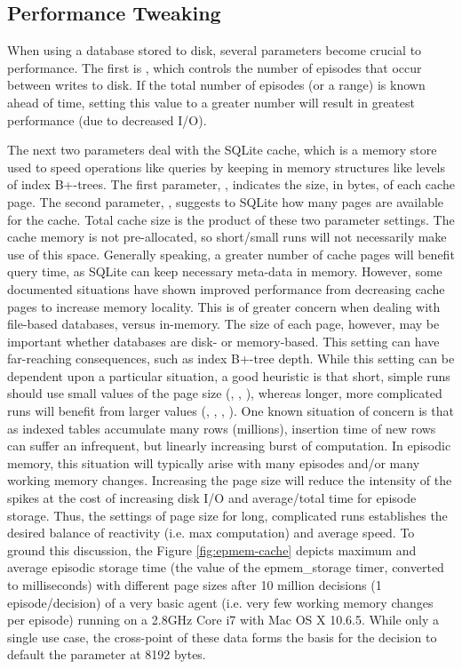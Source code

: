 \subsection{Performance Tweaking}
When using a database stored to disk, several parameters become crucial to performance.
The first is , which controls the number of episodes that occur between writes to disk.
If the total number of episodes (or a range) is known ahead of time, setting this value to a greater number will result in greatest performance (due to decreased I/O).

The next two parameters deal with the SQLite cache, which is a memory store used to speed operations like queries by keeping in memory structures like levels of index B+-trees.
The first parameter, , indicates the size, in bytes, of each cache page.
The second parameter, , suggests to SQLite how many pages are available for the cache.
Total cache size is the product of these two parameter settings.
The cache memory is not pre-allocated, so short/small runs will not necessarily make use of this space.
Generally speaking, a greater number of cache pages will benefit query time, as SQLite can keep necessary meta-data in memory.
However, some documented situations have shown improved performance from decreasing cache pages to increase memory locality.
This is of greater concern when dealing with file-based databases, versus in-memory.
The size of each page, however, may be important whether databases are disk- or memory-based.
This setting can have far-reaching consequences, such as index B+-tree depth.
While this setting can be dependent upon a particular situation, a good heuristic is that short, simple runs should use small values of the page size (, , ), whereas longer, more complicated runs will benefit from larger values (, , , ).
One known situation of concern is that as indexed tables accumulate many rows (\tild millions), insertion time of new rows can suffer an infrequent, but linearly increasing burst of computation.
In episodic memory, this situation will typically arise with many episodes and/or many working memory changes.
Increasing the page size will reduce the intensity of the spikes at the cost of increasing disk I/O and average/total time for episode storage.
Thus, the settings of page size for long, complicated runs establishes the desired balance of reactivity (i.e. max computation) and average speed.
To ground this discussion, the Figure \ref{fig:epmem-cache} depicts maximum and average episodic storage time (the value of the epmem\_storage timer, converted to milliseconds) with different page sizes after 10 million decisions (1 episode/decision) of a very basic agent (i.e. very few working memory changes per episode) running on a 2.8GHz Core i7 with Mac OS X 10.6.5.
While only a single use case, the cross-point of these data forms the basis for the decision to default the parameter at 8192 bytes.

